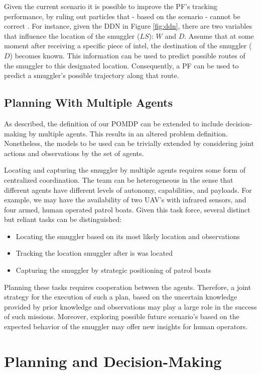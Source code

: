 \documentclass[conference]{IEEEtran}
\begin{document}
Given the current scenario it is possible to improve the PF's tracking performance, by ruling out particles that - based on the scenario - cannot be correct \cite{Claessens2015}. For instance, given the DDN in Figure \ref{fig:ddn}, there are two variables that influence the location of the smuggler ($LS$): $W$ and $D$. Assume that at some moment after receiving a specific piece of intel, the destination of the smuggler ($D$) becomes known. This information can be used to predict possible routes of the smuggler to this designated location. Consequently, a PF can be used to predict a smuggler's possible trajectory along that route.

\subsection{Planning With Multiple Agents}
\label{sub:plan-mult-ag}

As described, the definition of our POMDP can be extended to include decision-making by multiple agents. This results in an altered problem definition. Nonetheless, the models to be used can be trivially extended by considering joint actions and observations by the set of agents.

Locating and capturing the smuggler by multiple agents requires some form of centralized coordination. The team can be heterogeneous in the sense that different agents have different levels of autonomy, capabilities, and payloads. For example, we may have the availability of two UAV's with infrared sensors, and four armed, human operated patrol boats. Given this task force, several distinct but reliant tasks can be distinguished:
\begin{itemize}
\item Locating the smuggler based on its most likely location and observations
\item Tracking the location smuggler after is was located
\item Capturing the smuggler by strategic positioning of patrol boats
\end{itemize}
Planning these tasks requires cooperation between the agents. Therefore, a joint strategy for the execution of such a plan, based on the uncertain knowledge provided by prior knowledge and observations may play a large role in the success of such missions. Moreover, exploring possible future scenario's based on the expected behavior of the smuggler may offer new insights for human operators.

\section{Planning and Decision-Making}
\label{sec:ma-dec-mak}
\end{document}
